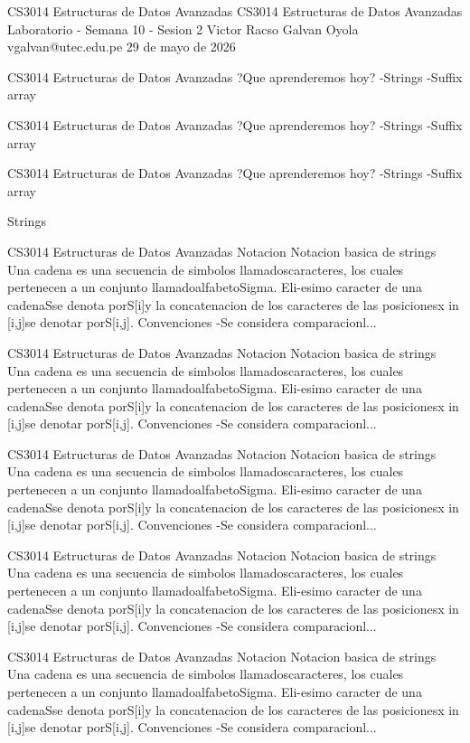 \begin{description}[leftmargin=!,labelwidth=4.2em,style=nextline]
\item[Pag. 1] CS3014 Estructuras de Datos Avanzadas CS3014 Estructuras de Datos Avanzadas Laboratorio - Semana 10 - Sesion 2 Victor Racso Galvan Oyola vgalvan@utec.edu.pe 29 de mayo de 2026
\item[Pag. 2] CS3014 Estructuras de Datos Avanzadas ?Que aprenderemos hoy? -Strings -Suffix array
\item[Pag. 3] CS3014 Estructuras de Datos Avanzadas ?Que aprenderemos hoy? -Strings -Suffix array
\item[Pag. 4] CS3014 Estructuras de Datos Avanzadas ?Que aprenderemos hoy? -Strings -Suffix array
\item[Pag. 5] Strings
\item[Pag. 6] CS3014 Estructuras de Datos Avanzadas Notacion Notacion basica de strings Una cadena es una secuencia de simbolos llamadoscaracteres, los cuales pertenecen a un conjunto llamadoalfabetoSigma. Eli-esimo caracter de una cadenaSse denota porS[i]y la concatenacion de los caracteres de las posicionesx in [i,j]se denotar porS[i,j]. Convenciones -Se considera comparacionl...
\item[Pag. 7] CS3014 Estructuras de Datos Avanzadas Notacion Notacion basica de strings Una cadena es una secuencia de simbolos llamadoscaracteres, los cuales pertenecen a un conjunto llamadoalfabetoSigma. Eli-esimo caracter de una cadenaSse denota porS[i]y la concatenacion de los caracteres de las posicionesx in [i,j]se denotar porS[i,j]. Convenciones -Se considera comparacionl...
\item[Pag. 8] CS3014 Estructuras de Datos Avanzadas Notacion Notacion basica de strings Una cadena es una secuencia de simbolos llamadoscaracteres, los cuales pertenecen a un conjunto llamadoalfabetoSigma. Eli-esimo caracter de una cadenaSse denota porS[i]y la concatenacion de los caracteres de las posicionesx in [i,j]se denotar porS[i,j]. Convenciones -Se considera comparacionl...
\item[Pag. 9] CS3014 Estructuras de Datos Avanzadas Notacion Notacion basica de strings Una cadena es una secuencia de simbolos llamadoscaracteres, los cuales pertenecen a un conjunto llamadoalfabetoSigma. Eli-esimo caracter de una cadenaSse denota porS[i]y la concatenacion de los caracteres de las posicionesx in [i,j]se denotar porS[i,j]. Convenciones -Se considera comparacionl...
\item[Pag. 10] CS3014 Estructuras de Datos Avanzadas Notacion Notacion basica de strings Una cadena es una secuencia de simbolos llamadoscaracteres, los cuales pertenecen a un conjunto llamadoalfabetoSigma. Eli-esimo caracter de una cadenaSse denota porS[i]y la concatenacion de los caracteres de las posicionesx in [i,j]se denotar porS[i,j]. Convenciones -Se considera comparacionl...

\end{description}
